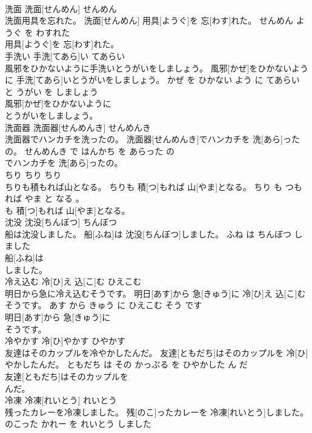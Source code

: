 \documentclass[8pt]{extreport}
\begin{document}
\begin{CJK}{UTF8}{min}
\\	洗面	洗面[せんめん]	せんめん	
\\	洗面用具を忘れた。	洗面[せんめん] 用具[ようぐ]を 忘[わす]れた。	せんめん ようぐ を わすれた	
\\	用具[ようぐ]を 忘[わす]れた。			
\\	手洗い	手洗[てあら]い	てあらい	
\\	風邪をひかないように手洗いとうがいをしましょう。	風邪[かぜ]をひかないように 手洗[てあら]いとうがいをしましょう。	かぜ を ひかない よう に てあらい と うがい を しましょう	
\\	風邪[かぜ]をひかないように
\\	とうがいをしましょう。			
\\	洗面器	洗面器[せんめんき]	せんめんき	
\\	洗面器でハンカチを洗ったの。	洗面器[せんめんき]でハンカチを 洗[あら]ったの。	せんめんき で はんかち を あらった の	
\\	でハンカチを 洗[あら]ったの。			
\\	ちり	ちり	ちり	
\\	ちりも積もれば山となる。	ちりも 積[つ]もれば 山[やま]となる。	ちり も つもれば やま と なる 。	
\\	も 積[つ]もれば 山[やま]となる。			
\\	沈没	沈没[ちんぼつ]	ちんぼつ	
\\	船は沈没しました。	船[ふね]は 沈没[ちんぼつ]しました。	ふね は ちんぼつ しました	
\\	船[ふね]は
\\	しました。			
\\	冷え込む	冷[ひ]え 込[こ]む	ひえこむ	
\\	明日から急に冷え込むそうです。	明日[あす]から 急[きゅう]に 冷[ひ]え 込[こ]むそうです。	あす から きゅう に ひえこむ そう です	
\\	明日[あす]から 急[きゅう]に
\\	そうです。			
\\	冷やかす	冷[ひ]やかす	ひやかす	
\\	友達はそのカップルを冷やかしたんだ。	友達[ともだち]はそのカップルを 冷[ひ]やかしたんだ。	ともだち は その かっぷる を ひやかした ん だ	
\\	友達[ともだち]はそのカップルを
\\	んだ。			
\\	冷凍	冷凍[れいとう]	れいとう	
\\	残ったカレーを冷凍しました。	残[のこ]ったカレーを 冷凍[れいとう]しました。	のこった かれー を れいとう しました	

\end{CJK}
\end{document}
